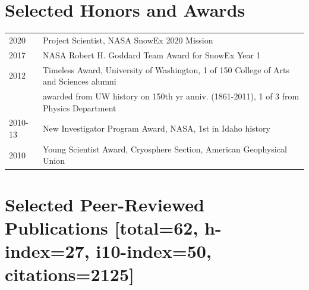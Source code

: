 \documentclass[11pt]{article}
\begin{document}
\section*{Selected Honors and Awards}
\begin{tabular}{ll}
2020 & Project Scientist, NASA SnowEx 2020 Mission \\
2017 & NASA Robert H. Goddard Team Award for SnowEx Year 1 \\
2012 & Timeless Award, University of Washington, 1 of 150 College of Arts and Sciences alumni  \\
& awarded from UW history on 150th yr anniv. (1861-2011), 1 of 3 from Physics Department \\
2010-13 & New Investigator Program Award, NASA, 1st in Idaho history \\
2010 & Young Scientist Award, Cryosphere Section, American Geophysical Union \\
\end{tabular}



\section*{Selected Peer-Reviewed Publications \small{[total=62, h-index=27, i10-index=50, citations=2125]}}
\end{document}
